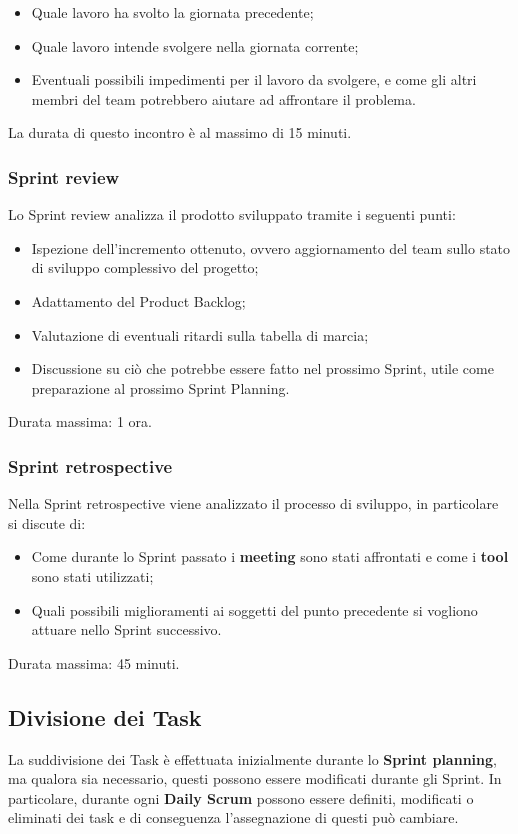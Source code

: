 \begin{itemize}
    \item Quale lavoro ha svolto la giornata precedente;
    \item Quale lavoro intende svolgere nella giornata corrente;
    \item Eventuali possibili impedimenti per il lavoro da svolgere, e come gli altri membri del team potrebbero aiutare ad affrontare il problema.
\end{itemize}
La durata di questo incontro è al massimo di 15 minuti.

\subsubsection{Sprint review}
Lo Sprint review analizza il prodotto sviluppato tramite i seguenti punti:

\begin{itemize}
    \item Ispezione dell'incremento ottenuto, ovvero aggiornamento del team sullo stato di sviluppo complessivo del progetto;
    \item Adattamento del Product Backlog;
    \item Valutazione di eventuali ritardi sulla tabella di marcia;
    \item Discussione su ciò che potrebbe essere fatto nel prossimo Sprint, utile come preparazione al prossimo Sprint Planning.
\end{itemize}
Durata massima: 1 ora.

\subsubsection{Sprint retrospective}
Nella Sprint retrospective viene analizzato il processo di sviluppo, in particolare si discute di:

\begin{itemize}
    \item Come durante lo Sprint passato i \textbf{meeting} sono stati affrontati e come i \textbf{tool} sono stati utilizzati;
    \item Quali possibili miglioramenti ai soggetti del punto precedente si vogliono attuare nello Sprint successivo.
\end{itemize}
Durata massima: 45 minuti.

\subsection{Divisione dei Task}
La suddivisione dei Task è effettuata inizialmente durante lo \textbf{Sprint planning}, ma qualora sia necessario, questi possono essere modificati durante gli Sprint. In particolare, durante ogni \textbf{Daily Scrum} possono essere definiti, modificati o eliminati dei task e di conseguenza l'assegnazione di questi può cambiare.

